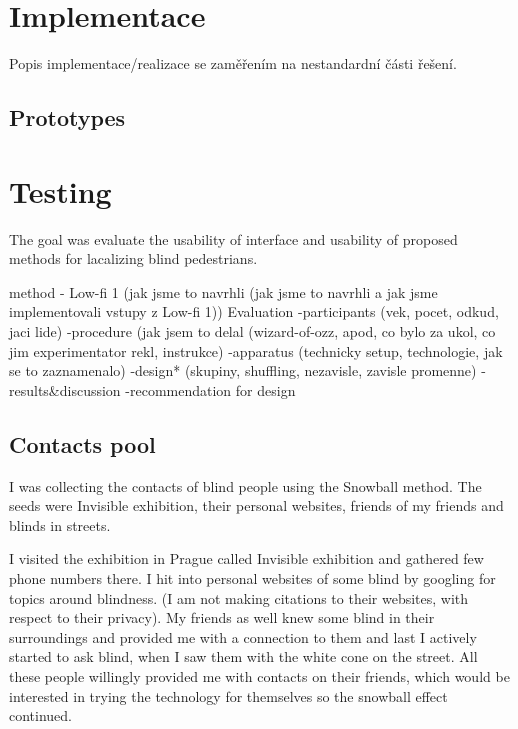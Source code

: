 \documentclass[11pt,twoside,a4paper]{book}
\begin{document}
	
	\chapter{Implementace}
	Popis implementace/realizace se zaměřením na nestandardní části řešení.
	\section{Prototypes} \label{sec:prototypes}
	
	
	\chapter{Testing}
	The goal was evaluate the usability of interface and usability of proposed methods for lacalizing blind pedestrians. 
	
	method - Low-fi 1
	(jak jsme to navrhli (jak jsme to navrhli a jak jsme implementovali vstupy z Low-fi 1))
	Evaluation
	-participants (vek, pocet, odkud, jaci lide)
	-procedure (jak jsem to delal (wizard-of-ozz, apod, co bylo za ukol, co jim experimentator rekl, instrukce)
	-apparatus (technicky setup, technologie, jak se to zaznamenalo)
	-design* (skupiny, shuffling, nezavisle, zavisle promenne)
	-results\&discussion
	-recommendation for design
	
	\section{Contacts pool} \label{sec:contactsPool}
	I was collecting the contacts of blind people using the Snowball method. The seeds were Invisible exhibition, their personal websites, friends of my friends and blinds in streets.
	
	I visited the exhibition in Prague called Invisible exhibition \cite{later} and gathered few phone numbers there. I hit into personal websites of some blind by googling for topics around blindness. (I am not making citations to their websites, with respect to their privacy). My friends as well knew some blind in their surroundings and provided me with a connection to them and last I actively started to ask blind, when I saw them with the white cone on the street. All these people willingly provided me with contacts on their friends, which would be interested in trying the technology for themselves so the snowball effect continued.
\end{document}
